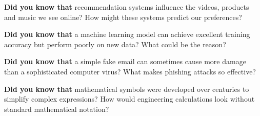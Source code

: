 \clearpage



\begin{center}
\begin{tcolorbox}[colback=SoftYellow, colframe=IEEEblue!70!black, boxrule=0.5pt, arc=0mm, left=3mm, right=3mm, top=1mm, bottom=1mm, width=0.92\textwidth]
\small\RaggedRight \textbf{\color{IEEEblue!75!black}Did you know that} recommendation systems influence the videos, products and music we see online? How might these systems predict our preferences?
\end{tcolorbox}
\end{center}

\clearpage



\begin{center}
\begin{tcolorbox}[colback=SoftYellow, colframe=IEEEblue!70!black, boxrule=0.5pt, arc=0mm, left=3mm, right=3mm, top=1mm, bottom=1mm, width=0.92\textwidth]
\small\RaggedRight \textbf{\color{IEEEblue!75!black}Did you know that} a machine learning model can achieve excellent training accuracy but perform poorly on new data? What could be the reason?
\end{tcolorbox}
\end{center}

\clearpage



\begin{center}
\begin{tcolorbox}[colback=SoftYellow, colframe=IEEEblue!70!black, boxrule=0.5pt, arc=0mm, left=3mm, right=3mm, top=1mm, bottom=1mm, width=0.92\textwidth]
\small\RaggedRight \textbf{\color{IEEEblue!75!black}Did you know that} a simple fake email can sometimes cause more damage than a sophisticated computer virus? What makes phishing attacks so effective?
\end{tcolorbox}
\end{center}

\clearpage



\begin{center}
\begin{tcolorbox}[colback=SoftYellow, colframe=IEEEblue!70!black, boxrule=0.5pt, arc=0mm, left=3mm, right=3mm, top=1mm, bottom=1mm, width=0.92\textwidth]
\small\RaggedRight \textbf{\color{IEEEblue!75!black}Did you know that} mathematical symbols were developed over centuries to simplify complex expressions? How would engineering calculations look without standard mathematical notation?
\end{tcolorbox}
\end{center}

